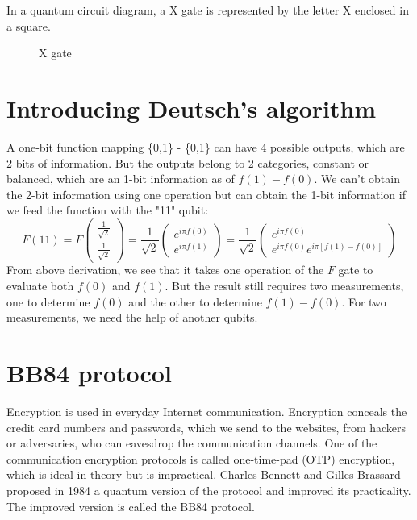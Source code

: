 \documentclass{book}
\begin{document}
In a quantum circuit diagram, a X gate is represented by the letter X enclosed in a square.
\begin{figure}[ht]
\begin{quantikz} %
\end{quantikz}
\caption{X gate}
\label{Xgate}
\end{figure}

\section{Introducing Deutsch's algorithm}
A one-bit function mapping \{0,1\} -\> \{0,1\} can have 4 possible outputs, which are 2 bits of information. But the outputs belong to 2 categories, constant or balanced, which are an 1-bit information as of $f(1)-f(0)$. We can't obtain the 2-bit information using one operation but can obtain the 1-bit information if we feed the function with the "11" qubit:
\begin{equation}\label{DeutschF}
    F(11)=F
\begin{pmatrix}
\frac 1 {\sqrt 2} \\
\frac 1 {\sqrt 2}
\end{pmatrix}
= \frac 1 {\sqrt 2}
\begin{pmatrix}
e^{i\pi f(0)} \\
e^{i\pi f(1)}
\end{pmatrix}
= \frac 1 {\sqrt 2} 
\begin{pmatrix}
e^{i\pi f(0)} \\
e^{i\pi f(0)} e^{i\pi [f(1)-f(0)]}
\end{pmatrix}
\end{equation}
From above derivation, we see that it takes one operation of the $F$ gate to evaluate both $f(0)$ and $f(1)$. But the result still requires two measurements, one to determine $f(0)$ and the other to determine $f(1)-f(0)$. For two measurements, we need the help of another qubits.

\section{BB84 protocol}
Encryption is used in everyday Internet communication. Encryption conceals the credit card numbers and passwords, which we send to the websites, from hackers or adversaries, who can eavesdrop the communication channels. One of the communication encryption protocols is called one-time-pad (OTP) encryption, which is ideal in theory but is impractical. Charles Bennett and Gilles Brassard proposed in 1984 a quantum version of the protocol and improved its practicality. The improved version is called the BB84 protocol\cite{BB84}.
\end{document}
